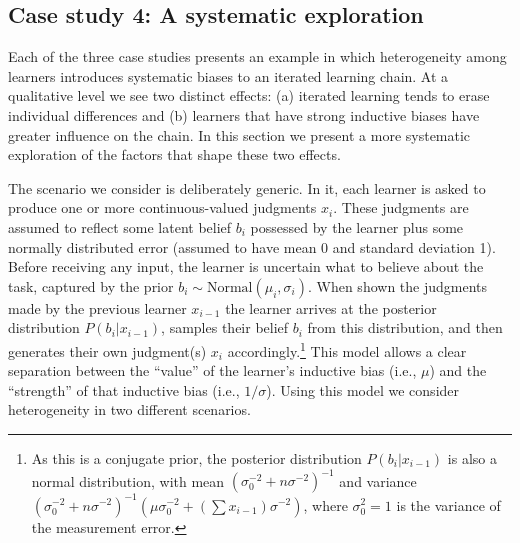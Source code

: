 \documentclass[doc]{apa6}
\begin{document}
\subsection{Case study 4: A systematic exploration}

Each of the three case studies presents an example in which heterogeneity among learners introduces systematic biases to an iterated learning chain. At a qualitative level we see two distinct effects: (a) iterated learning tends to erase individual differences and (b) learners that have strong inductive biases have greater influence on the chain. In this section we present a more systematic exploration of the factors that shape these two effects.

The scenario we consider is  deliberately generic. In it, each learner is asked to produce one or more continuous-valued judgments $x_i$. These judgments are assumed to reflect some latent belief $b_i$ possessed by the learner plus some normally distributed error (assumed to have mean 0 and standard deviation 1). Before receiving any input, the learner is uncertain what to believe about the task, captured by the prior $b_i \sim \mbox{Normal}(\mu_i, \sigma_i)$. When shown the judgments made by the previous learner $x_{i-1}$ the learner arrives at the posterior distribution $P(b_i|x_{i-1})$, samples their belief $b_i$ from this distribution, and then generates their own judgment(s) $x_i$ accordingly.\footnote{As this is a conjugate prior, the posterior distribution $P(b_i | x_{i-1})$ is also a normal distribution, with mean $(\sigma_0^{-2} + n\sigma^{-2})^{-1}$ and variance $(\sigma_0^{-2} + n\sigma^{-2})^{-1}(\mu \sigma_0^{-2} + (\sum x_{i-1}) \sigma^{-2})$, where $\sigma_0^{2}=1$ is the variance of the measurement error.} This model allows a clear separation between the ``value'' of the learner's inductive bias (i.e.,  $\mu$) and the ``strength'' of that inductive bias (i.e., $1/\sigma$). Using this model we consider heterogeneity in two different scenarios.

\smallskip
\end{document}
